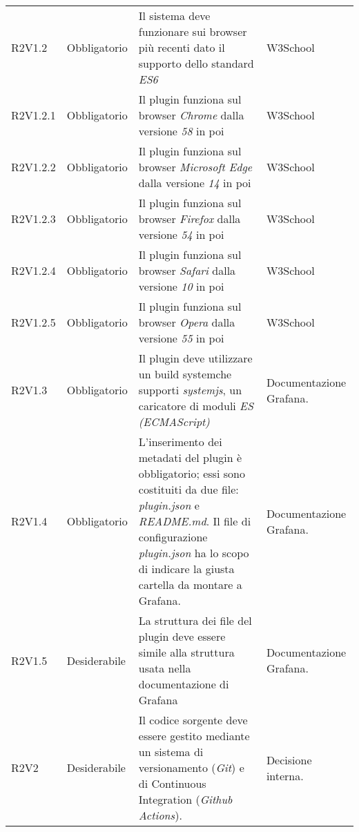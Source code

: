\begin{longtable} {
		>{\centering}p{18mm} 
		>{\centering}p{28mm}
		>{}p{50mm} 
		>{}p{28mm}
		}
	R2V1.2 & 
	Obbligatorio & 
	Il sistema deve funzionare sui browser più recenti dato il supporto dello standard \textit{ES6} &
	W3School  \TBstrut \\ [2mm]
	
	R2V1.2.1 & 
	Obbligatorio & 
	Il plugin funziona sul browser \textit{Chrome} dalla versione \textit{58} in poi &
	W3School  \TBstrut \\ [2mm]
	
	R2V1.2.2 & 
	Obbligatorio & 
	Il plugin funziona sul browser \textit{Microsoft Edge} dalla versione \textit{14} in poi &
	W3School  \TBstrut \\ [2mm]
	
	R2V1.2.3 & 
	Obbligatorio & 
	Il plugin funziona sul browser \textit{Firefox} dalla versione \textit{54} in poi &
	W3School  \TBstrut \\ [2mm]
	
	R2V1.2.4 & 
	Obbligatorio & 
	Il plugin funziona sul browser \textit{Safari} dalla versione \textit{10} in poi &
	W3School  \TBstrut \\ [2mm]
	
	R2V1.2.5 & 
	Obbligatorio & 
	Il plugin funziona sul browser \textit{Opera} dalla versione \textit{55} in poi &
	W3School  \TBstrut \\ [2mm]
	
	R2V1.3 & 
	Obbligatorio & 
	Il plugin deve utilizzare un build system\glosp che supporti \textit{systemjs}, un caricatore di moduli \textit{ES (ECMAScript)} &
	Documentazione Grafana\glo.  \TBstrut \\ [2mm]

	R2V1.4 & 
	Obbligatorio & 
	L'inserimento dei metadati del plugin è obbligatorio; essi sono costituiti da due file: \textit{plugin.json} e \textit{README.md}. Il file di configurazione \textit{plugin.json} ha lo scopo di indicare la giusta cartella da montare a Grafana\glo . &
	Documentazione Grafana\glo.  \TBstrut \\ [2mm]
	
	R2V1.5 &
	Desiderabile &
	La struttura dei file del plugin deve essere simile alla struttura usata nella documentazione di Grafana\glo &
	Documentazione Grafana\glo.  \TBstrut \\ [2mm]
		
	R2V2 &
	Desiderabile &
	Il codice sorgente deve essere gestito mediante un sistema di versionamento (\textit{Git}) e di Continuous Integration (\textit{Github Actions}). &
	Decisione interna.  \TBstrut \\ [2mm]		
	

\end{longtable}
